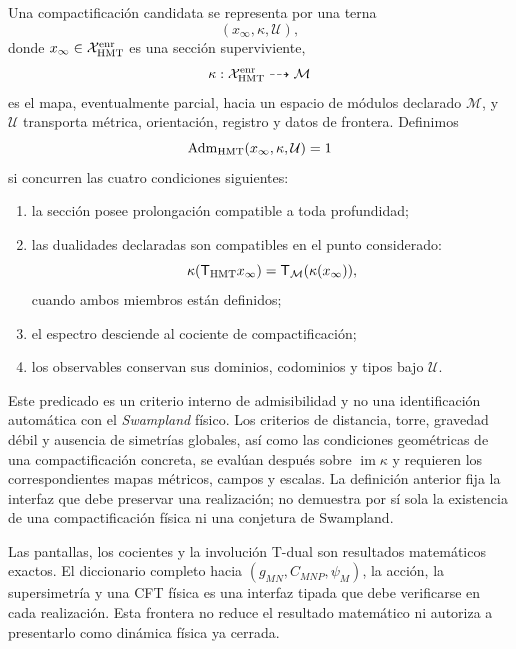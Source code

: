 \begin{definition}
\label{mdp4:def:admisibilidad-compactificacion-hmt-rev3}
Una compactificación candidata se representa por una terna
\[
 (x_\infty,\kappa,\mathcal U),
\]
donde \(x_\infty\in\mathcal X_{\rm HMT}^{\rm enr}\) es una sección
superviviente,
\[
 \kappa:\mathcal X_{\rm HMT}^{\rm enr}\dashrightarrow\mathcal M
\]
es el mapa, eventualmente parcial, hacia un espacio de módulos declarado
\(\mathcal M\), y
\(\mathcal U\) transporta métrica, orientación, registro y datos de frontera.
Definimos
\[
 \operatorname{Adm}_{\rm HMT}(x_\infty,\kappa,\mathcal U)=1
\]
si concurren las cuatro condiciones siguientes:
\begin{enumerate}
 \item la sección posee prolongación compatible a toda profundidad;
 \item las dualidades declaradas son compatibles en el punto considerado:
       \[
        \kappa(\mathsf T_{\rm HMT}x_\infty)
        =\mathsf T_{\mathcal M}(\kappa(x_\infty)),
       \]
       cuando ambos miembros están definidos;
 \item el espectro desciende al cociente de compactificación;
 \item los observables conservan sus dominios, codominios y tipos bajo
       \(\mathcal U\).
\end{enumerate}
\end{definition}

Este predicado es un criterio interno de admisibilidad y no una
identificación automática con el \emph{Swampland} físico. Los criterios de
distancia, torre, gravedad débil y ausencia de simetrías globales, así como
las condiciones geométricas de una compactificación concreta, se evalúan
después sobre \(\operatorname{im}\kappa\) y requieren los correspondientes
mapas métricos, campos y escalas. La definición anterior fija la interfaz que
debe preservar una realización; no demuestra por sí sola la existencia de
una compactificación física ni una conjetura de Swampland.

\begin{statusbox}[title={Alcance de la interfaz}]
Las pantallas, los cocientes y la involución T-dual son resultados
matemáticos exactos. El diccionario completo hacia
\((g_{MN},C_{MNP},\psi_M)\), la acción, la supersimetría y una CFT física es
una interfaz tipada que debe verificarse en cada realización. Esta frontera
no reduce el resultado matemático ni autoriza a presentarlo como dinámica
física ya cerrada.
\end{statusbox}

